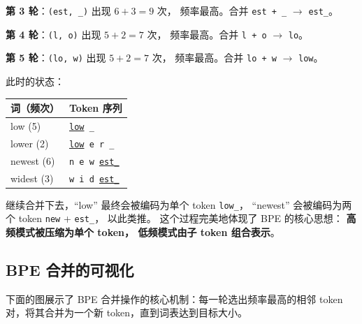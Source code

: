 \textbf{第 3 轮}：\texttt{(est, \_)} 出现 $6 + 3 = 9$ 次，
频率最高。合并 \texttt{est + \_} $\to$ \texttt{est\_}。

\textbf{第 4 轮}：\texttt{(l, o)} 出现 $5 + 2 = 7$ 次，
频率最高。合并 \texttt{l + o} $\to$ \texttt{lo}。

\textbf{第 5 轮}：\texttt{(lo, w)} 出现 $5 + 2 = 7$ 次，
频率最高。合并 \texttt{lo + w} $\to$ \texttt{low}。

此时的状态：

\begin{center}\small
\renewcommand{\arraystretch}{1.3}
\begin{tabular}{ll}
\toprule
\rowcolor{figLightGray}
\textbf{词（频次）} & \textbf{Token 序列} \\
\midrule
low (5)    & \texttt{\underline{low} \_} \\
lower (2)  & \texttt{\underline{low} e r \_} \\
newest (6) & \texttt{n e w \underline{est\_}} \\
widest (3) & \texttt{w i d \underline{est\_}} \\
\bottomrule
\end{tabular}
\end{center}

继续合并下去，“low” 最终会被编码为单个 token \texttt{low\_}，
“newest” 会被编码为两个 token \texttt{new} + \texttt{est\_}，
以此类推。
这个过程完美地体现了 BPE 的核心思想：
\textbf{高频模式被压缩为单个 token，
低频模式由子 token 组合表示}。

\subsection{BPE 合并的可视化}

下面的图展示了 BPE 合并操作的核心机制：每一轮选出频率最高的相邻 token 对，将其合并为一个新 token，直到词表达到目标大小。

